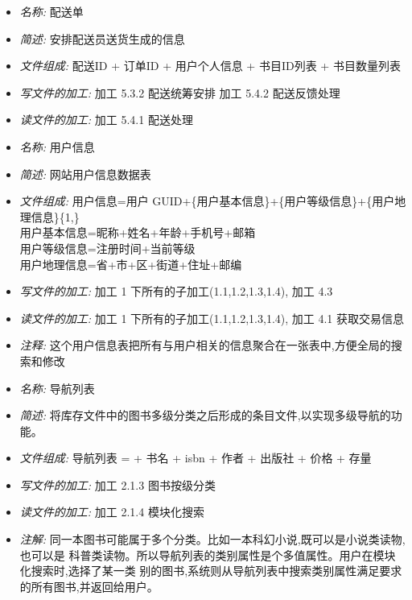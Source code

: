 \documentclass{article}
\begin{document}
\begin{CJK*}{UTF8}{gbsn}
\begin{itemize}
\end{itemize}


\vspace{-1mm}


\begin{itemize}
\item \textit{名称: }配送单
\item \textit{简述: } 安排配送员送货生成的信息
\item \textit{文件组成: } 配送ID + 订单ID + 用户个人信息 + 书目ID列表 + 书目数量列表 
\item \textit{写文件的加工: }加工 5.3.2 配送统筹安排 加工 5.4.2 配送反馈处理 
\item \textit{读文件的加工: }加工 5.4.1 配送处理

\end{itemize}


\vspace{-1mm}


\begin{itemize}
\item \textit{名称: } 用户信息
\item \textit{简述: } 网站用户信息数据表
\item \textit{文件组成: } 用户信息=用户 GUID+\{用户基本信息\}+\{用户等级信息\}+\{用户地理信息\}\{1,\} \\ 用户基本信息=昵称+姓名+年龄+手机号+邮箱 \\
用户等级信息=注册时间+当前等级 \\
用户地理信息=省+市+区+街道+住址+邮编
\item \textit{写文件的加工: } 加工 1 下所有的子加工(1.1,1.2,1.3,1.4), 加工 4.3
\item \textit{读文件的加工: } 加工 1 下所有的子加工(1.1,1.2,1.3,1.4), 加工 4.1 获取交易信息 
\item \textit{注释: } 这个用户信息表把所有与用户相关的信息聚合在一张表中,方便全局的搜索和修改

\end{itemize}


\vspace{-1mm}


\begin{itemize}
\item \textit{名称: }导航列表 
\item \textit{简述: }将库存文件中的图书多级分类之后形成的条目文件,以实现多级导航的功能。 
\item \textit{文件组成: }导航列表 = + 书名 + isbn + 作者 + 出版社 + 价格 + 存量 
\item \textit{写文件的加工: }加工 2.1.3 图书按级分类
\item \textit{读文件的加工: }加工 2.1.4 模块化搜索 
\item \textit{注解: }同一本图书可能属于多个分类。比如一本科幻小说,既可以是小说类读物,也可以是 科普类读物。所以导航列表的类别属性是个多值属性。用户在模块化搜索时,选择了某一类 别的图书,系统则从导航列表中搜索类别属性满足要求的所有图书,并返回给用户。


\end{itemize}
\end{CJK*}
\end{document}
